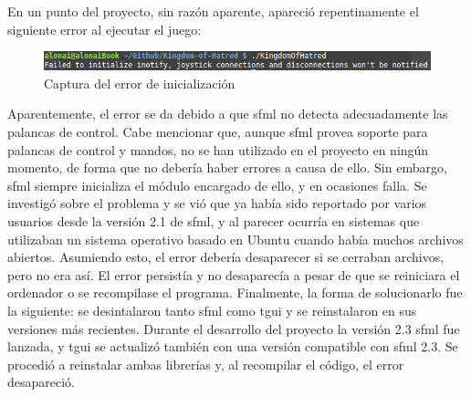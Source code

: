 	En un punto del proyecto, sin razón aparente, apareció repentinamente el siguiente error al ejecutar el juego:

	\begin{figure}[!htp]
		 \centering
		 \includegraphics[scale=.5]{fig/inotify}
		 \caption{Captura del error de inicialización}
		 \label{fig:inotify}
	\end{figure}

	\FloatBarrier

	Aparentemente, el error se da debido a que \acrshort{sfml} no detecta adecuadamente las palancas de control. Cabe mencionar que, aunque \acrshort{sfml} provea soporte para palancas de control y mandos, no se han utilizado en el proyecto en ningún momento, de forma que no debería haber errores a causa de ello. Sin embargo, \acrshort{sfml} siempre inicializa el módulo encargado de ello, y en ocasiones falla. Se investigó sobre el problema y se vió que ya había sido reportado por varios usuarios desde la versión 2.1 de \acrshort{sfml}, y al parecer ocurría en sistemas que utilizaban un sistema operativo basado en Ubuntu cuando había muchos archivos abiertos. Asumiendo esto, el error debería desaparecer si se cerraban archivos, pero no era así. El error persistía y no desaparecía a pesar de que se reiniciara el ordenador o se recompilase el programa. Finalmente, la forma de solucionarlo fue la siguiente: se desintalaron tanto \acrshort{sfml} como \acrshort{tgui} y se reinstalaron en sus versiones más recientes. Durante el desarrollo del proyecto la versión 2.3 \acrshort{sfml} fue lanzada, y \acrshort{tgui} se actualizó también con una versión compatible con \acrshort{sfml} 2.3. Se procedió a reinstalar ambas librerías y, al recompilar el código, el error desapareció.
